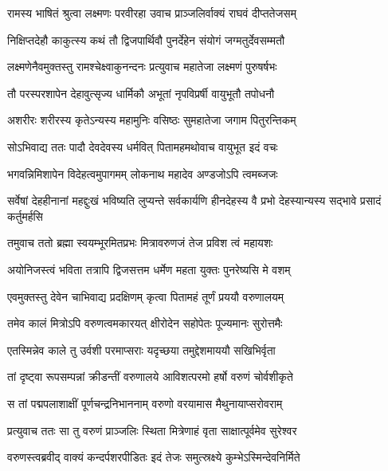 
\twolineshloka
{रामस्य भाषितं श्रुत्वा लक्ष्मणः परवीरहा}
{उवाच प्राञ्जलिर्वाक्यं राघवं दीप्ततेजसम्} %

\twolineshloka
{निक्षिप्तदेहौ काकुत्स्य कथं तौ द्विजपार्थिवौ}
{पुनर्देहेन संयोगं जग्मतुर्देवसम्मतौ} %

\twolineshloka
{लक्ष्मणेनैवमुक्तस्तु रामश्चेक्ष्वाकुनन्दनः}
{प्रत्युवाच महातेजा लक्ष्मणं पुरुषर्षभः} %

\twolineshloka
{तौ परस्परशापेन देहावुत्सृज्य धार्मिकौ}
{अभूतां नृपविप्रर्षी वायुभूतौ तपोधनौ} %

\twolineshloka
{अशरीरः शरीरस्य कृतेऽन्यस्य महामुनिः}
{वसिष्ठः सुमहातेजा जगाम पितुरन्तिकम्} %

\twolineshloka
{सोऽभिवाद्य ततः पादौ देवदेवस्य धर्मवित्}
{पितामहमथोवाच वायुभूत इदं वचः} %

\twolineshloka
{भगवन्निमिशापेन विदेहत्वमुपागमम्}
{लोकनाथ महादेव अण्डजोऽपि त्वमब्जजः} %

\threelineshloka
{सर्वेषां देहहीनानां महद्दुःखं भविष्यति}
{लुप्यन्ते सर्वकार्यणि हीनदेहस्य वै प्रभो}
{देहस्यान्यस्य सद्भावे प्रसादं कर्तुमर्हसि} %

\twolineshloka
{तमुवाच ततो ब्रह्मा स्वयम्भूरमितप्रभः}
{मित्रावरुणजं तेज प्रविश त्वं महायशः} %

\twolineshloka
{अयोनिजस्त्वं भविता तत्रापि द्विजसत्तम}
{धर्मेण महता युक्तः पुनरेष्यसि मे वशम्} %

\twolineshloka
{एवमुक्तस्तु देवेन चाभिवाद्य प्रदक्षिणम्}
{कृत्वा पितामहं तूर्णं प्रययौ वरुणालयम्} %

\twolineshloka
{तमेव कालं मित्रोऽपि वरुणत्वमकारयत्}
{क्षीरोदेन सहोपेतः पूज्यमानः सुरोत्तमैः} %

\twolineshloka
{एतस्मिन्नेव काले तु उर्वशी परमाप्सराः}
{यदृच्छया तमुद्देशमाययौ सखिभिर्वृता} %

\twolineshloka
{तां दृष्ट्वा रूपसम्पन्नां क्रीडन्तीं वरुणालये}
{आविशत्परमो हर्षो वरुणं चोर्वशीकृते} %

\twolineshloka
{स तां पद्मपलाशाक्षीं पूर्णचन्द्रनिभाननाम्}
{वरुणो वरयामास मैथुनायाप्सरोवराम्} %

\twolineshloka
{प्रत्युवाच ततः सा तु वरुणं प्राञ्जलिः स्थिता}
{मित्रेणाहं वृता साक्षात्पूर्वमेव सुरेश्वर} %

\twolineshloka
{वरुणस्त्वब्रवीद् वाक्यं कन्दर्पशरपीडितः}
{इदं तेजः समुत्स्रक्ष्ये कुम्भेऽस्मिन्देवनिर्मिते} %

